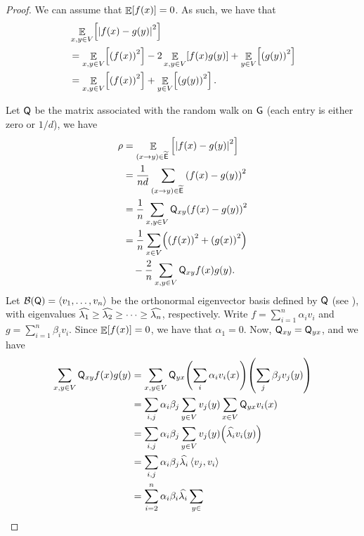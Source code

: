 \begin{proof}
    We can assume that $\mathop{\mathbb{E}}\!\left[ {f(x)} \right]=0$. As such, we have that
    \begin{align}
        \eqlab{reduction:2} & \ExExt{x,y \in
           V}{\cardin{f(x)- g(y)}^2} \\
        &=%
        \ExExt{x,y \in V}{\pth[]{f(x)}^2} -2 \ExExt{x,y \in V}{ f(x)
           g(y)} + \ExExt{y \in V}{\pth[]{g(y)}^2} \nonumber \\
        &=%
        \ExExt{x,y \in V}{\pth[]{f(x)}^2} + \ExExt{y \in
           V}{\pth[]{g(y)}^2}.
    \end{align}

    Let $\mathsf{Q}$ be the matrix associated with the random walk on
    $\mathsf{G}$ (each entry is either zero or $1/d$), we have
    \begin{align*}
        \rho &= \ExExt{\dirEdge{x}{y} \in \DEdges\;}{
           \cardin{f(x)-g(y)}^2 } \\ & = \frac{1}{nd}
        \sum_{\dirEdge{x}{y} \in \DEdges\;}\pth{ f(x) -g(y) }^2 \\
        &= \frac{1}{n} \sum_{x,y \in V} \TMtrx_{xy} \pth{f(x) - g(y)}^2\\
        &= \frac{1}{n}\sum_{x\in V} \pth{\pth{f(x)}^2 +\pth{ g(x)}^2}
        \\ &\quad - \frac{2}{n} \sum_{x,y \in V} \TMtrx_{xy} f(x)g(y).
    \end{align*}
    Let $\mathcal{B}(\mathsf{Q})= \left\langle {v_1,\ldots, v_n} \right\rangle$ be the orthonormal
    eigenvector basis defined by $\mathsf{Q}$ (see
    ), with eigenvalues $\widehat{\lambda_{1}}
    \geq \widehat{\lambda_{2}} \geq \cdots \geq \widehat{\lambda_{n}}$, respectively. Write
    $f=\sum_{i=1}^n \alpha_i v_i$ and $g=\sum_{i=1}^n \beta_i
    v_i$. Since $\mathop{\mathbb{E}}\!\left[ {f(x)} \right] = 0$, we have that $\alpha_1 = 0$. Now,
    $\mathsf{Q}_{xy}= \mathsf{Q}_{yx}$, and we have
    \begin{align*}
        \sum_{x,y \in V} \TMtrx_{xy} f(x) g(y) &= \sum_{x,y \in V}
        \TMtrx_{yx} \pth{\sum_{i} \alpha_iv_i(x)} \pth{\sum_{j}
           \beta_jv_j(y)} \\ &= \sum_{i,j} \alpha_i \beta_j \sum_{y\in V}
        v_j(y) \sum_{x \in V} \TMtrx_{yx} v_i(x) %
        \\ & =%
        \sum_{i,j} \alpha_i \beta_j \sum_{y\in V} v_j(y) \pth{\TEV{i}
           v_i \pth{y} \MakeBig} \\ &=%
        \sum_{i,j} \alpha_i \beta_j \TEV{i} \DotProd{v_j}{v_i}
        \\ &=%
        \sum_{i=2}^n \alpha_i \beta_i \TEV{i} \sum_{y\in
}
\end{align*}
\end{proof}
